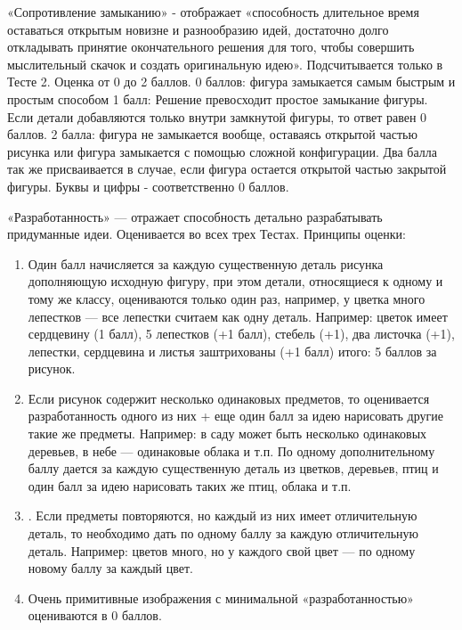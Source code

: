 \begin{landscape}
\begin{multicols}{3}
{«Сопротивление замыканию» - отображает «способность длительное время 
оставаться открытым новизне и разнообразию идей, достаточно долго 
откладывать принятие окончательного решения для того, чтобы 
совершить мыслительный скачок и создать оригинальную идею». 
Подсчитывается только в Тесте 2. Оценка от 0 до 2 баллов.
0 баллов: фигура замыкается самым быстрым и простым способом
1 балл: Решение превосходит простое замыкание фигуры. 
Если детали добавляются 
только внутри замкнутой фигуры, то ответ равен 0 баллов.
2 балла: фигура не замыкается вообще, оставаясь 
открытой частью рисунка или фигура замыкается с помощью 
сложной конфигурации. Два балла так же присваивается в случае, 
если фигура остается открытой частью закрытой фигуры. 
Буквы и цифры - соответственно 0 баллов.

«Разработанность» — отражает способность детально разрабатывать придуманные 
идеи. Оценивается во всех трех Тестах. Принципы оценки:
\begin{enumerate}[noitemsep,topsep=0pt,parsep=0pt,partopsep=0pt]
    \item  Один балл начисляется за каждую существенную деталь рисунка 
    дополняющую исходную фигуру, при этом детали, 
    относящиеся к одному и тому же классу, оцениваются только 
    один раз, например, у цветка много лепестков — все лепестки 
    считаем как одну деталь. Например: цветок имеет сердцевину 
    (1 балл), 5 лепестков (+1 балл), стебель (+1), два листочка (+1), 
    лепестки, сердцевина и листья заштрихованы (+1 балл) итого: 
    5 баллов за рисунок.
    \item  Если рисунок содержит несколько одинаковых предметов, 
    то оценивается разработанность одного из них + еще один балл 
    за идею нарисовать другие такие же предметы. Например: в саду 
    может быть несколько одинаковых деревьев, в небе — одинаковые 
    облака и т.п. По одному дополнительному баллу дается за каждую 
    существенную деталь из цветков, деревьев, птиц и один балл за идею 
    нарисовать таких же птиц, облака и т.п.
    \item . Если предметы повторяются, но каждый из них имеет 
    отличительную деталь, то необходимо дать по одному баллу за 
    каждую отличительную деталь. Например: цветов много, но у 
    каждого свой цвет — по одному новому баллу за каждый цвет.
    \item  Очень примитивные изображения с минимальной «разработанностью» 
    оцениваются в 0 баллов.
    \end{enumerate}  }\newcolumn
    \begin{center}
        \large{
        \vspace*{1.5cm}
 
}
\end{center}
\end{multicols}
\end{landscape}
